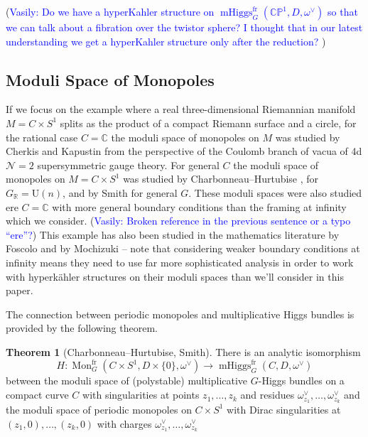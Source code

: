 \documentclass[11pt, oneside, reqno]{amsart}
\theoremstyle{definition} \newtheorem{definition}{Definition}[section]
\newtheorem{theorem}[definition]{Theorem}
\theoremstyle{definition} \newtheorem{remark}[definition]{Remark}
\theoremstyle{definition} \newtheorem{remarks}[definition]{Remarks}
\theoremstyle{definition} \newtheorem{question}[definition]{Question}
\theoremstyle{definition} \newtheorem*{note}{Note}
\theoremstyle{definition} \newtheorem{example}[definition]{Example}
\theoremstyle{definition} \newtheorem{examples}[definition]{Examples}
\newcommand{\bb}[1]{\mathbb{#1}}
\newcommand{\mr}[1]{\mathrm{#1}}
\newcommand{\CC}{\mathbb{C}}
\newcommand{\RR}{\mathbb{R}}
\DeclareMathOperator{\mhiggs}{mHiggs}
\DeclareMathOperator{\mon}{Mon}
\newcommand{\fr}{\mathrm{fr}}
\newcommand{\vasily}[1]{(\textcolor{blue}{Vasily: #1})}
\begin{document}
 \vasily{Do we have a hyperKahler structure on $\mhiggs^{\text{fr}}_G(\bb{CP}^1,D,\omega^\vee)$ so that we can talk about a fibration over the twistor sphere?
   I thought that in our latest understanding we get a hyperKahler structure only after the reduction? 
} 

\subsection{Moduli Space of Monopoles}

If we focus on the example where a real three-dimensional Riemannian
manifold $M = C \times S^1$ splits as the product of a compact Riemann
surface and a circle, for the rational case $C = \CC$ the moduli space
of monopoles on $M$ was studied by Cherkis and Kapustin
\cite{CherkisKapustin1,CherkisKapustin2,CherkisKapustin3} from the
perspective of the Coulomb branch of vacua of 4d $\mathcal{N}=2$
supersymmetric gauge theory. For general $C$ the moduli space of
monopoles on $M = C \times S^{1}$ was studied by
Charbonneau--Hurtubise \cite{CharbonneauHurtubise}, for
$G_\RR = \mr U(n)$, and by Smith \cite{Smith} for general $G$.  These
moduli spaces were also studied ere $C = \CC$
with more general boundary conditions than the framing at infinity
which we consider.  \vasily{Broken reference in the previous sentence or a typo ``ere''?} This example has also been studied in the
mathematics literature by Foscolo \cite{FoscoloDef, FoscoloThesis} and
by Mochizuki \cite{Mochizuki} -- note that considering weaker boundary
conditions at infinity means they need to use far more sophisticated
analysis in order to work with hyperk\"ahler structures on their
moduli spaces than we'll consider in this paper.

The connection between periodic monopoles and multiplicative Higgs bundles is provided by the following theorem.
\begin{theorem}[Charbonneau--Hurtubise, Smith]
  There is an analytic isomorphism 
  \begin{equation*}
    H: \mon_G^\fr(C \times S^1,D \times\{0\},\omega^\vee) \to \mhiggs_G^{\text{fr}}(C,D,\omega^\vee)
  \end{equation*}
between the moduli space of (polystable) multiplicative $G$-Higgs bundles on a compact curve $C$ with singularities at points $z_1, \ldots, z_k$ and residues $\omega^\vee_{z_1}, \ldots, \omega^\vee_{z_k}$ and the moduli space of periodic monopoles on $C \times S^1$ with Dirac singularities at $(z_1,0), \ldots, (z_k,0)$ with charges $\omega^\vee_{z_1}, \ldots, \omega^\vee_{z_k}$
\end{theorem}
\end{document}
